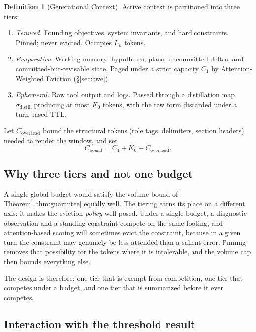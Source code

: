 \documentclass[11pt,a4paper]{article}
\theoremstyle{plain}
\theoremstyle{definition}
\newtheorem{definition}{Definition}
\theoremstyle{remark}
\begin{document}
\begin{definition}[Generational Context]
\label{def:gc}
Active context is partitioned into three tiers:
\begin{enumerate}[label=\textbf{Gen-\arabic*}, leftmargin=*]
  \item \emph{Tenured.} Founding objectives, system invariants, and hard
        constraints. Pinned; never evicted. Occupies $L_u$ tokens.
  \item \emph{Evaporative.} Working memory: hypotheses, plans, uncommitted
        deltas, and committed-but-revisable state. Paged under a strict capacity
        $C_1$ by Attention-Weighted Eviction (\S\ref{sec:awe}).
  \item \emph{Ephemeral.} Raw tool output and logs. Passed through a
        distillation map $\sigma_{\mathrm{distill}}$ producing at most $K_0$
        tokens, with the raw form discarded under a turn-based TTL.
\end{enumerate}
Let $C_{\mathrm{overhead}}$ bound the structural tokens (role tags, delimiters,
section headers) needed to render the window, and set
\begin{equation}
  C_{\mathrm{bound}} = C_1 + K_0 + C_{\mathrm{overhead}} .
  \label{eq:cbound}
\end{equation}
\end{definition}

\subsection{Why three tiers and not one budget}

A single global budget would satisfy the volume bound of
Theorem~\ref{thm:guarantee} equally well. The tiering earns its place on a
different axis: it makes the eviction \emph{policy} well posed. Under a single
budget, a diagnostic observation and a standing constraint compete on the same
footing, and attention-based scoring will sometimes evict the constraint,
because in a given turn the constraint may genuinely be less attended than a
salient error. Pinning removes that possibility for the tokens where it is
intolerable, and the volume cap then bounds everything else.

The design is therefore: one tier that is exempt from competition, one tier that
competes under a budget, and one tier that is summarized before it ever
competes.

\subsection{Interaction with the threshold result}
\end{document}
